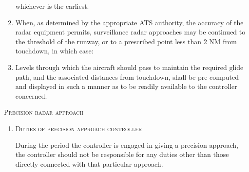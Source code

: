 \begin{enumeratesc}
\begin{enumerate}
\begin{enumalph}

            \noindent whichever is the earliest.
        \end{enumalph}

        \item \label{8.9.7.1.4} When, as determined by the appropriate ATS authority, the accuracy of the radar equipment permits, surveillance radar approaches may be continued to the threshold of the runway, or to a prescribed point less than 2 NM from touchdown, in which case:

        \item Levels through which the aircraft should pass to maintain the required glide path, and the associated distances from touchdown, shall be pre-computed and displayed in such a manner as to be readily available to the controller concerned.
    \end{enumerate}

    \item \textsc{Precision radar approach}
    \begin{enumerate}[labelindent=0pt,itemsep=0.2cm]
        \item \textsc{Duties of precision approach controller}
        \par\noindent During the period the controller is engaged in giving a precision approach, the controller should not be responsible for any duties other than those directly connected with that particular approach.


\end{enumerate}
\end{enumeratesc}
